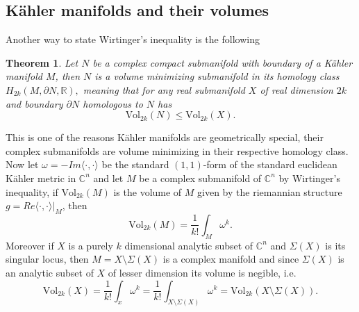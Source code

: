 \documentclass[12pt,twoside,a4paper]{report}
\newtheorem{theorem}{Theorem}[section]
\newcommand{\re}{\ensuremath{\mathbb R }}
\newcommand{\con}{\ensuremath{\mathbb{C}^n}}
\begin{document}
\subsection{Kähler manifolds and their volumes}
\noindent Another way to state Wirtinger's inequality is the following
\begin{theorem}\label{wirtinger}
        Let $N$ be a complex compact submanifold with boundary of a Kähler manifold $M$, then $N$ is a volume minimizing
        submanifold in its homology class $H_{2k}(M,\partial N,\re),$ meaning that for any real submanifold $X$ of
        real dimension $2k$ and boundary $\partial N$ homologous to $N$ has
        \[
          \textrm{Vol}_{2k}(N)\leq \textrm{Vol}_{2k}(X).
        \]
\end{theorem}
\noindent This is one of the reasons Kähler manifolds are geometrically special, their complex submanifolds are volume minimizing in their respective homology class. Now let $\omega=-Im\langle\cdot,\cdot\rangle$ be the standard $(1,1)$-form of the standard euclidean Kähler metric in $\con$ and let $M$ be a complex submanifold of $\con$ by Wirtinger's inequality, if $\textrm{Vol}_{2k}(M)$ is the volume of $M$ given by the riemannian structure $g=Re\langle\cdot,\cdot\rangle\vert_{M}$, then
\begin{equation}
        \textrm{Vol}_{2k}(M)= \frac{1}{k!}\int_M \omega^k.
\end{equation}
\noindent Moreover if $X$ is a purely $k$ dimensional analytic subset of $\con$ and $\Sigma(X)$ is its singular locus, then $M=X\setminus\Sigma(X)$ is a complex manifold and since $\Sigma(X)$ is an analytic subset of $X$ of lesser dimension its volume is negible, i.e.
\[
    \textrm{Vol}_{2k}(X)= \frac{1}{k!}\int_{x} \omega^k=
                              \frac{1}{k!}\int_{X\setminus\Sigma(X)} \omega^k=
                                                            \textrm{Vol}_{2k}(X\setminus\Sigma(X)).
\]
\end{document}
